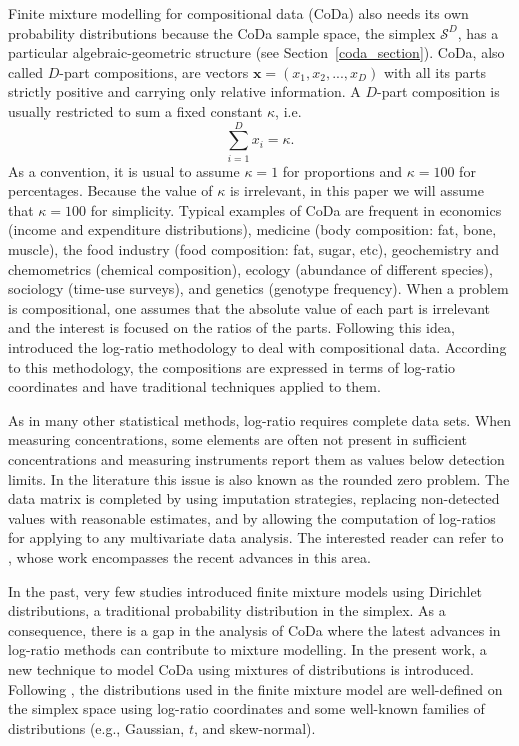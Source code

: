 \documentclass[12pt, a4paper]{article}
\theoremstyle{definition}
\begin{document}
Finite mixture modelling for compositional data (CoDa) also needs its own probability distributions because the CoDa sample space, the simplex $\mathcal{S}^D$, has a particular algebraic-geometric structure (see Section~\ref{coda_section}).
CoDa, also called $D$-part compositions, are vectors $\textbf{x} = (x_1, x_2, ..., x_D)$ with all its parts strictly positive  and carrying only relative information. A $D$-part composition is usually restricted to sum a fixed constant $\kappa$, i.e.
\begin{equation}
\sum_{i=1 }^D x_i = \kappa.
\label{sum_to_constant}
\end{equation}
As a convention, it is usual to assume $\kappa =1$ for proportions and $\kappa = 100$ for percentages. Because the value of $\kappa$ is irrelevant, in this paper we will assume that $\kappa = 100$ for simplicity. Typical examples of CoDa are frequent in economics (income and expenditure distributions), medicine (body composition: fat, bone, muscle), the food industry (food composition: fat, sugar, etc), geochemistry and chemometrics (chemical composition), ecology (abundance of different species), sociology (time-use surveys), and genetics (genotype frequency). 
When a problem is compositional, one assumes that the absolute value of each part is irrelevant and the interest is focused on the ratios of the parts. Following this idea, \cite{aitchison1986statistical} introduced the log-ratio methodology to deal with compositional data. According to this methodology, the compositions are expressed in terms of log-ratio coordinates and have traditional techniques applied to them.

As in many other statistical methods, log-ratio requires complete data sets. When measuring concentrations, some elements are often not present in sufficient concentrations and measuring instruments report them as values below detection limits. In the literature this issue is also known as the rounded zero problem. The data matrix is completed by using imputation strategies, replacing non-detected values with reasonable estimates, and by allowing the computation of log-ratios for applying to any multivariate data analysis. The interested reader can refer to \cite{palarea2014compositional}, whose work encompasses the recent advances in this area.

In the past, very few studies \citep[e.g.,][]{albert1982mixtures, bouguila2004unsupervised} introduced finite mixture models using Dirichlet distributions, a traditional probability distribution in the simplex. As a consequence, there is a gap in the analysis of CoDa where the latest advances in log-ratio methods can contribute to mixture modelling. In the present work, a new technique to model CoDa using mixtures of distributions is introduced. Following \cite{mateu2013normal}, the distributions used in the finite mixture model are well-defined on the simplex space using log-ratio coordinates and some well-known families of distributions (e.g., Gaussian, $t$, and skew-normal).
\end{document}
